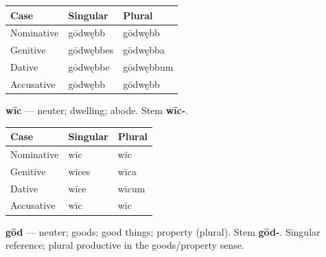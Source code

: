 \par\begingroup
\fontsize{10.5}{13.2}\selectfont
\setlength{\LTleft}{0pt}\setlength{\LTright}{\fill}
\noindent
\begin{tabular}{@{}>{\raggedright\arraybackslash}p{39.46mm}>{\raggedright\arraybackslash}p{39.46mm}>{\raggedright\arraybackslash}p{39.46mm}@{}}
\toprule
\textbf{Case} & \textbf{Singular} & \textbf{Plural} \\
\midrule
Nominative & gōdwębb & gōdwębb \\
Genitive & gōdwębbes & gōdwębba \\
Dative & gōdwębbe & gōdwębbum \\
Accusative & gōdwębb & gōdwębb \\
\bottomrule
\end{tabular}
\par\endgroup

\textbf{wīc} — neuter; dwelling; abode. Stem \textbf{wīc-}.

\par\begingroup
\fontsize{10.5}{13.2}\selectfont
\setlength{\LTleft}{0pt}\setlength{\LTright}{\fill}
\noindent
\begin{tabular}{@{}>{\raggedright\arraybackslash}p{39.46mm}>{\raggedright\arraybackslash}p{39.46mm}>{\raggedright\arraybackslash}p{39.46mm}@{}}
\toprule
\textbf{Case} & \textbf{Singular} & \textbf{Plural} \\
\midrule
Nominative & wīc & wīc \\
Genitive & wīces & wīca \\
Dative & wīce & wīcum \\
Accusative & wīc & wīc \\
\bottomrule
\end{tabular}
\par\endgroup

\textbf{gōd} — neuter; goods; good things; property (plural). Stem \textbf{gōd-}. Singular reference; plural productive in the goods/\allowbreak{}property sense.

